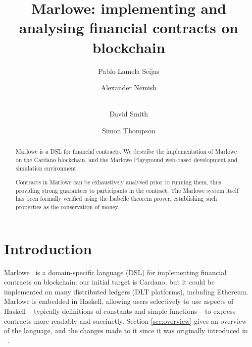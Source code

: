 \documentclass[runningheads]{llncs}
\begin{document}
%
\title{Marlowe: implementing and analysing financial contracts on blockchain}%
%
%
\author{
Pablo {Lamela Seijas} \and
Alexander Nemish \and \\
David Smith \and
Simon Thompson}%
%

%
%
\maketitle              %

\vspace{-4mm}
\begin{abstract}
Marlowe is a DSL for financial contracts. We describe the implementation of Marlowe on the Cardano blockchain, and the Marlowe Playground web-based development and simulation environment.

Contracts in Marlowe can be exhaustively analysed prior to running them, thus providing strong guarantees to participants in the contract. The Marlowe system itself has been formally verified using the Isabelle theorem prover, establishing such properties as the conservation of money.

\end{abstract}


\section{Introduction}

Marlowe~\cite{marlowe-github} is a domain-specific language (DSL) for implementing financial contracts on blockchain: our initial target is Cardano, but it could be implemented on many distributed ledgers (DLT platforms), including Ethereum. Marlowe is embedded in Haskell, allowing users selectively to use aspects of Haskell -- typically definitions of constants and simple functions -- to express contracts more readably and succinctly. Section \ref{sec:overview} gives an overview of the language, and the changes made to it since it was originally introduced in ~\cite{isola-marlowe}.
\end{document}

